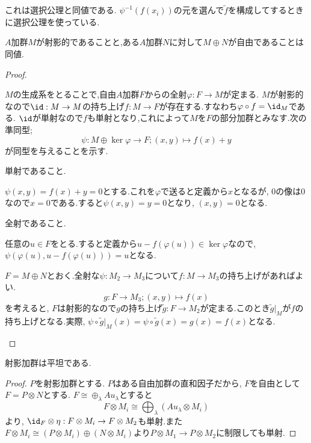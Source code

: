 これは選択公理と同値である. $\psi^{-1}(f(x_i))$の元を選んで$\widetilde{f}$を構成してするときに選択公理を使っている.
\begin{thm}
	$A$加群$M$が射影的であることと,ある$A$加群$N$に対して$M\oplus N$が自由であることは同値.
\end{thm}
\begin{proof}
	\begin{eqv}
		\item 
		$M$の生成系をとることで,自由$A$加群$F$からの全射$\varphi:F\to M$が定まる. $M$が射影的なので$\id:M\to M$の持ち上げ$f:M\to F$が存在する.すなわち$\varphi\circ f=\id_M$である. $\id$が単射なので$f$も単射となり,これによって$M$を$F$の部分加群とみなす.次の準同型;
		\[\psi:M\oplus \ker\varphi\to F;(x,y)\mapsto f(x)+y\]
		が同型を与えることを示す.
		
		\begin{mrkw}
			\item 単射であること.
			
			$\psi(x,y)=f(x)+y=0$とする.これを$\varphi$で送ると定義から$x$となるが, 0の像は0なので$x=0$である.すると$\psi(x,y)=y=0$となり, $(x,y)=0$となる.
			\item 全射であること.
			
			任意の$u\in F$をとる.すると定義から$u-f(\varphi(u))\in\ker\varphi$なので, $\psi(\varphi(u),u-f(\varphi(u)))=u$となる.
		\end{mrkw}
		\item 
		$F=M\oplus N$とおく.全射な$\psi:M_2\to M_3$について$f:M\to M_3$の持ち上げがあればよい.
		\[g:F\to M_3;(x,y)\mapsto f(x)\]
		を考えると, $F$は射影的なので$g$の持ち上げ$\widetilde{g}:F\to M_2$が定まる.このとき$\widetilde{g}|_M$が$f$の持ち上げとなる.実際, $\psi\circ\widetilde{g}|_M(x)=\psi\circ\widetilde{g}(x)=g(x)=f(x)$となる.
	\end{eqv}
\end{proof}

\begin{thm}
	射影加群は平坦である.
\end{thm}
\begin{proof}
	$P$を射影加群とする. $P$はある自由加群の直和因子だから, $F$を自由として$F=P\otimes N$とする. $F\cong\oplus_\lambda Au_\lambda$とすると
	\[F\otimes M_i\cong \bigoplus_\lambda (Au_\lambda\otimes M_i)\]
	より, $\id_{F}\otimes\eta:F\otimes M_i\to F\otimes M_2$も単射.また$F\otimes M_i\cong (P\otimes M_i)\oplus (N\otimes M_i)$より$P\otimes M_1\to P\otimes M_2$に制限しても単射.
\end{proof}

